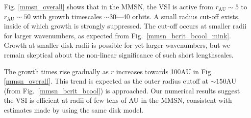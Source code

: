 Fig. \ref{mmsn_overall} shows that in the MMSN, the VSI  is active
from $r_\mathrm{AU}\sim 5$ to $r_\mathrm{AU}\sim 
50$ with growth timescales $\sim 30$---40 orbits.  A small radius
cut-off exists, inside of which growth is strongly suppressed.  The 
cut-off occurs at smaller radii for larger wavenumbers, as expected
from Fig.\ \ref{mmsn_bcrit_bcool_mink}.  Growth at smaller disk radii
is possible for yet larger wavenumbers, but we remain skeptical about
the non-linear significance of such short lengthscales. 

The growth times rise gradually as $r$ increases towards 100AU in
Fig. \ref{mmsn_overall}.  This trend is expected as the outer radius
cutoff at $\sim 150$AU (from Fig.\ \ref{mmsn_bcrit_bcool}) is
approached. Our numerical results suggest the VSI is efficient at
radii of few tens of AU in the MMSN, consistent with estimates made by
 using the same disk model.   

%





